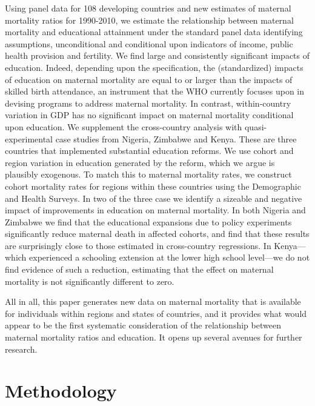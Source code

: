 \documentclass{article}[12pt,subeqn]
\begin{document}
\begin{spacing}{1.4}
Using panel data for 108 developing countries and new estimates of maternal 
mortality ratios for 1990-2010, we estimate the relationship between maternal 
mortality and educational attainment under the standard panel data identifying 
assumptions, unconditional and conditional upon indicators of income, public 
health provision and fertility. We find large and consistently significant impacts 
of education. Indeed, depending upon the specification, the (standardized) impacts 
of education on maternal mortality are equal to or larger than the impacts of 
skilled birth attendance, an instrument that the WHO currently focuses upon in 
devising programs to address maternal mortality. In contrast, within-country 
variation in GDP has no significant impact on maternal mortality conditional upon 
education. We supplement the cross-country analysis with quasi-experimental case 
studies from Nigeria, Zimbabwe and Kenya. These are three countries that 
implemented substantial education reforms. We use cohort and region variation in 
education generated by the reform, which we argue is plausibly exogenous. To match 
this to maternal mortality rates, we construct cohort mortality rates for regions 
within these countries using the Demographic and Health Surveys. In two of the 
three case we identify a sizeable and negative impact of improvements in education 
on maternal mortality. In both Nigeria and Zimbabwe we find that the educational 
expansions due to policy experiments significantly reduce maternal death in
affected cohorts, and find that these results are surprisingly close to those 
estimated in cross-country regressions.  In Kenya---which experienced a schooling 
extension at the lower high school level---we do not find evidence of such a 
reduction, estimating that the effect on maternal mortality is not significantly 
different to zero.

All in all, this paper generates new data on maternal mortality that is available 
for individuals within regions and states of countries, and it provides what would 
appear to be the first systematic consideration of the relationship between 
maternal mortality ratios and education. It opens up several avenues for further 
research.

\section{Methodology}

\end{spacing}
\end{document}
